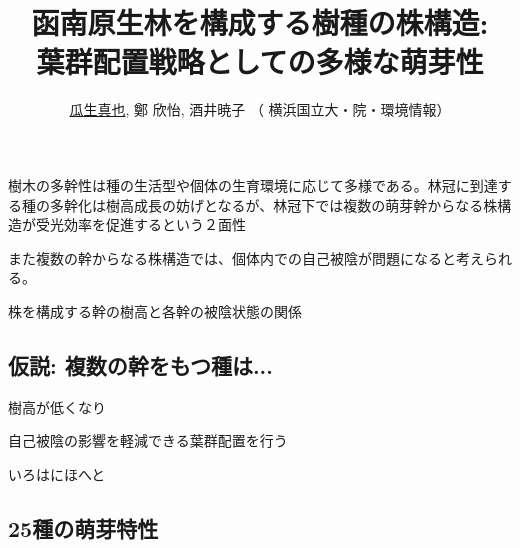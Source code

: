 \documentclass[a0, 36pt, plainboxedsections]{sciposter} %
\title{函南原生林を構成する樹種の株構造:\\葉群配置戦略としての多様な萌芽性}
\author{\faUser \hspace{0.02em} \underline{瓜生真也}, 鄭 欣怡, 酒井暁子 （\faUniv \hspace{0.02em} 横浜国立大・院・環境情報） \normalsize{\faEnvelope \hspace{0.02em} \textit{\fontspec{ComicSansMS}{suika1127@gmail.com}}}}
\begin{document}
\maketitle
\begin{multicols}{2}

\begin{mdframed}[style=section.frame]
  \centering\huge{}
\end{mdframed}

樹木の多幹性は種の生活型や個体の生育環境に応じて多様である。林冠に到達する種の多幹化は樹高成長の妨げとなるが、林冠下では複数の萌芽幹からなる株構造が受光効率を促進するという２面性

また複数の幹からなる株構造では、個体内での自己被陰が問題になると考えられる。

株を構成する幹の樹高と各幹の被陰状態の関係

\subsection*{仮説: 複数の幹をもつ種は...}

\begin{list}{}{\setlength{\itemindent}{1em}} %
 \item 樹高が低くなり
 \item 自己被陰の影響を軽減できる葉群配置を行う
\end{list}

\begin{mdframed}[style=conclusion.frame]
  \centering\huge{}
  
  \flushleft\normalsize{いろはにほへと}
\end{mdframed}

\end{multicols}

\begin{mdframed}[style=section.frame]
  \centering\huge{}
\end{mdframed}

\subsection*{25種の萌芽特性}
\end{document}
